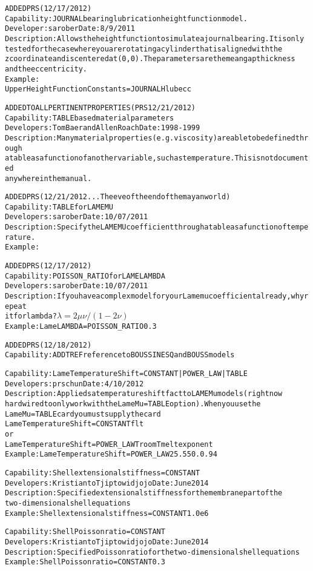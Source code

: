 \documentclass{article}
\begin{document}
\begin{alltt}
ADDED PRS (12/17/2012)
Capability:  JOURNAL bearing lubrication height function model.
Developer:  sarober  Date:  8/9/2011
Description:  Allows the height function to simulate a journal bearing.  It is only 
  tested for the case where you are rotating a cylinder that is aligned with the 
  z coordinate and is centered at (0,0).  The parameters are the mean gap thickness 
  and the eccentricity.  
Example:
  Upper Height Function Constants = JOURNAL {Hlub} {ecc}

ADDED TO ALL PERTINENT PROPERTIES (PRS 12/21/2012)
Capability:  TABLE based material parameters
Developers: Tom Baer and Allen Roach  Date:  1998-1999
Description:  Many material properties (e.g. viscosity) are able to be defined through
  a table as a function of another variable, such as temperature.  This is not documented 
  anywhere in the manual.

ADDED PRS (12/21/2012...The eve of the end of the mayan world)
Capability:  TABLE for LAME MU
Developers:  sarober  Date:  10/07/2011
Description:  Specify the LAME MU coefficient through a table as a function of temperature.
Example:  

ADDED PRS (12/17/2012)
Capability:  POISSON_RATIO for LAME LAMBDA
Developers:  sarober  Date:  10/07/2011
Description: If you have a complex model for your Lame mu coefficient already, why repeat 
  it for lambda?  \(\lambda=2\mu\nu/(1-2\nu)\)
Example:  Lame LAMBDA = POISSON_RATIO 0.3

ADDED PRS (12/18/2012)
Capability: ADD TREF reference to BOUSSINESQ and BOUSS models 

Capability:  Lame Temperature Shift = {CONSTANT | POWER_LAW | TABLE}
Developers: prschun  Date: 4/10/2012
Description: Applieds a temperature shift fact to LAME Mu models (right now
hardwired to only work with the Lame Mu = TABLE option).   When you use the
Lame Mu = TABLE card you must supply the card
	Lame Temperature Shift = CONSTANT {flt}
or
        Lame Temperature Shift = POWER_LAW {Troom} {Tmelt} {exponent}
Example: Lame Temperature Shift = POWER_LAW 25. 550. 0.94

Capability:  Shell extensional stiffness = {CONSTANT}
Developers: Kristianto Tjiptowidjojo  Date: June 2014
Description: Specified extensional stiffness for the membrane part of the
two-dimensional shell equations
Example: Shell extensional stiffness     = CONSTANT	1.0e6

Capability: Shell Poisson ratio = {CONSTANT}
Developers: Kristianto Tjiptowidjojo  Date: June 2014
Description: Specified Poisson ratio for the two-dimensional shell equations
Example: Shell Poisson ratio     = CONSTANT	0.3



\end{alltt}
\end{document}
